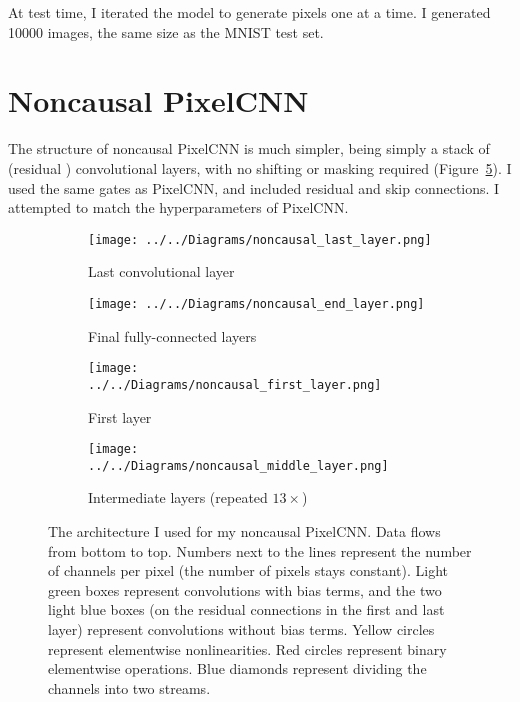\documentclass[11pt, a4paper, openany]{book}
\begin{document}
At test time, I iterated the model to generate pixels one at a time. I generated 10000 images, the same size as the MNIST test set.

\section{Noncausal PixelCNN}

The structure of noncausal PixelCNN is much simpler, being simply a stack of (residual \citep{resnet}) convolutional layers, with no shifting or masking required (Figure~\ref{noncausal}). I used the same gates as PixelCNN, and included residual and skip connections. I attempted to match the hyperparameters of PixelCNN.

\begin{figure}
  \centering
    \begin{subfigure}{0.35\columnwidth}
    	\addtocounter{subfigure}{2}
        \centering
        \caption{Last convolutional layer}
        \texttt{[image: ../../Diagrams/noncausal\_last\_layer.png]} 
        \label{noncausal:last}
    \end{subfigure}
    \hfill
    \begin{subfigure}{0.45\columnwidth}
        \centering
        \caption{Final fully-connected layers}
        \texttt{[image: ../../Diagrams/noncausal\_end\_layer.png]} 
        \label{noncausal:end}
    \end{subfigure}
    \vspace{1cm}
    \addtocounter{subfigure}{-4}
    \begin{subfigure}{0.35\columnwidth}
        \centering
        \caption{First layer}
        \texttt{[image: ../../Diagrams/noncausal\_first\_layer.png]} 
        \label{noncausal:first}
    \end{subfigure}
    \hfill
    \begin{subfigure}{0.35\columnwidth}
        \centering
        \caption{Intermediate layers (repeated $13\times$)}
        \texttt{[image: ../../Diagrams/noncausal\_middle\_layer.png]} 
        \label{noncausal:middle}
    \end{subfigure}
  \caption[Architecture of noncausal PixelCNN]{The architecture I used for my noncausal PixelCNN. Data flows from bottom to top. Numbers next to the lines represent the number of channels per pixel (the number of pixels stays constant). Light green boxes represent convolutions with bias terms, and the two light blue boxes (on the residual connections in the first and last layer) represent convolutions without bias terms. Yellow circles represent elementwise nonlinearities. Red circles represent binary elementwise operations. Blue diamonds represent dividing the channels into two streams.}
  \label{noncausal}
\end{figure}
\end{document}
